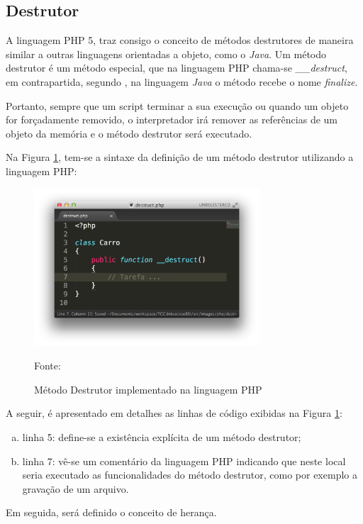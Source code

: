 \subsection{Destrutor}

A linguagem \acs{PHP} 5, traz consigo o conceito de métodos destrutores de maneira
similar a outras linguagens orientadas a objeto, como o \textit{Java}. Um método
destrutor é um método especial, que na linguagem \acs{PHP} chama-se
\textit{\_\_destruct}, em contrapartida, segundo , na
linguagem \textit{Java} o método recebe o nome \textit{finalize}.

Portanto, sempre que um script terminar a sua execução ou quando um objeto for
forçadamente removido, o interpretador irá remover as referências de um objeto
da memória e o método destrutor será executado.

Na Figura \ref{fig:metodoDestrutor}, tem-se a sintaxe da definição de um
método destrutor utilizando a linguagem \acs{PHP}:

\begin{figure}[h!tb]
	\caption{Método Destrutor implementado na linguagem PHP}
	\label{fig:metodoDestrutor}

	\centering
	\includegraphics[width=0.75\textwidth]{images/destruct.png}

	\centering
	\footnotesize Fonte: \fonteOAutor
\end{figure}

\FloatBarrier 	%

A seguir, é apresentado em detalhes as linhas de código exibidas na Figura 
\ref{fig:metodoDestrutor}:

\begin{enumerate}[a)]
    \item linha 5: define-se a existência explícita de um método destrutor;
    \item linha 7: vê-se um comentário da linguagem \acs{PHP} indicando que
    neste local seria executado as funcionalidades do método destrutor, como
    por exemplo a gravação de um arquivo.
\end{enumerate}

Em seguida, será definido o conceito de herança.